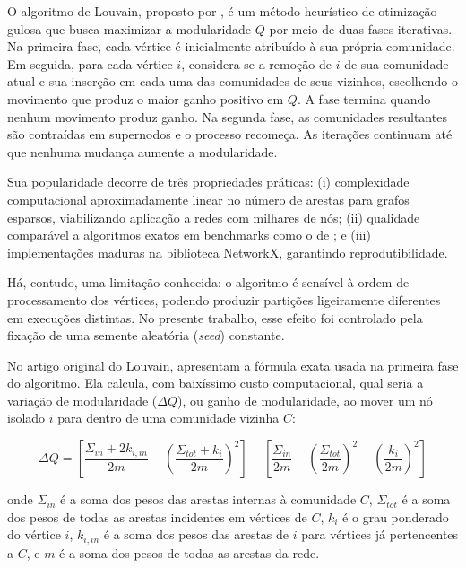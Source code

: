 \documentclass[
      12pt,
      a4paper,
      openright,
      oneside,
      chapter=TITLE,
      section=TITLE,
      english,
      french,
      spanish,
      brazilian
    ]{abntex2}
\begin{document}
    O algoritmo de Louvain, proposto por \cite{blondel2008}, é um método heurístico de otimização gulosa que busca maximizar a modularidade $Q$ por meio de duas fases iterativas. Na primeira fase, cada vértice é inicialmente atribuído à sua própria comunidade. Em seguida, para cada vértice $i$, considera-se a remoção de $i$ de sua comunidade atual e sua inserção em cada uma das comunidades de seus vizinhos, escolhendo o movimento que produz o maior ganho positivo em $Q$. A fase termina quando nenhum movimento produz ganho. Na segunda fase, as comunidades resultantes são contraídas em supernodos e o processo recomeça. As iterações continuam até que nenhuma mudança aumente a modularidade.
    
    Sua popularidade decorre de três propriedades práticas: (i) complexidade computacional aproximadamente linear no número de arestas para grafos esparsos, viabilizando aplicação a redes com milhares de nós; (ii) qualidade comparável a algoritmos exatos em benchmarks como o de \cite{lancichinetti2008}; e (iii) implementações maduras na biblioteca NetworkX, garantindo reprodutibilidade.
    
    Há, contudo, uma limitação conhecida: o algoritmo é sensível à ordem de processamento dos vértices, podendo produzir partições ligeiramente diferentes em execuções distintas. No presente trabalho, esse efeito foi controlado pela fixação de uma semente aleatória (\textit{seed}) constante.
    
    No artigo original do Louvain,  apresentam a fórmula exata usada na primeira fase do algoritmo. Ela calcula, com baixíssimo custo computacional, qual seria a variação de modularidade ($\Delta Q$), ou ganho de modularidade, ao mover um nó isolado $i$ para dentro de uma comunidade vizinha $C$:
    
    \begin{equation}
    \Delta Q = \left[ \frac{\Sigma_{in} + 2k_{i,in}}{2m} - \left( \frac{\Sigma_{tot} + k_i}{2m} \right)^2 \right] - \left[ \frac{\Sigma_{in}}{2m} - \left( \frac{\Sigma_{tot}}{2m} \right)^2 - \left( \frac{k_i}{2m} \right)^2 \right]
    \label{eq:delta_q}
    \end{equation}
    
    onde $\Sigma_{in}$ é a soma dos pesos das arestas internas à comunidade $C$, $\Sigma_{tot}$ é a soma dos pesos de todas as arestas incidentes em vértices de $C$, $k_i$ é o grau ponderado do vértice $i$, $k_{i,in}$ é a soma dos pesos das arestas de $i$ para vértices já pertencentes a $C$, e $m$ é a soma dos pesos de todas as arestas da rede.
    
\end{document}
